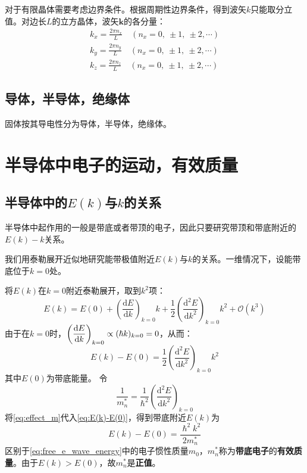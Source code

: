 对于有限晶体需要考虑边界条件。根据周期性边界条件，得到波矢$k$只能取分立值。对边长$L$的立方晶体，波矢$\bm k$的各分量：
\begin{equation}
\begin{split}
    k_x=\frac{2\pi n_x}{L}\quad (n_x=0,\ \pm 1,\ \pm 2,\cdots)\\
    k_y=\frac{2\pi n_y}{L}\quad (n_x=0,\ \pm 1,\ \pm 2,\cdots)\\
    k_z=\frac{2\pi n_z}{L}\quad (n_x=0,\ \pm 1,\ \pm 2,\cdots)
\end{split}
\end{equation}

\subsection{导体，半导体，绝缘体}

固体按其导电性分为导体，半导体，绝缘体。

\section{半导体中电子的运动，有效质量}

\subsection{半导体中的\texorpdfstring{$E(k)$}{E(k)}与\texorpdfstring{$k$}{k}的关系}

半导体中起作用的一般是带底或者带顶的电子，因此只要研究带顶和带底附近的$E(k)-k$关系。

我们用泰勒展开近似地研究能带极值附近$E(k)$与$k$的关系。一维情况下，设能带底位于$k=0$处。

将$E(k)$在$k=0$附近泰勒展开，取到$k^2$项：
\begin{equation}
    E(k)=E(0)+\left(\frac{\mathrm{d}E}{\mathrm{d}k}\right)_{k=0}k+\frac{1}{2}\left(\frac{\mathrm{d^2}E}{\mathrm{d}k^2}\right)_{k=0}k^2+\mathcal{O}(k^3)
\end{equation}
\vspace{1ex}由于在$k=0$时，$\displaystyle\left(\frac{\mathrm{d}E}{\mathrm{d}k}\right)_{k=0}\propto (\hslash k)_{k=0}=0$，从而：
\begin{equation}
    E(k)-E(0)=\frac{1}{2}\left(\frac{\mathrm{d}^2E}{\mathrm{d}k^2}\right)_{k=0}k^2\label{eq:E(k)-E(0)}
\end{equation}
其中$E(0)$为带底能量。
令
\begin{equation}
    \frac{1}{m_n^*}=\frac{1}{\hslash^2}\left(\frac{\mathrm{d}^2E}{\mathrm{d}k^2}\right)_{k=0}\label{eq:effect_m}
\end{equation}
将\autoref{eq:effect_m}代入\autoref{eq:E(k)-E(0)}，得到带底附近$E(k)$为
\begin{equation}
    E(k)-E(0)=\frac{\hslash^2k^2}{2m_n^*}\label{eq:electron_effect_mass_energy_bottom}
\end{equation}
区别于\autoref{eq:free_e_wave_energy}中的电子惯性质量$m_0$，$m_n^*$称为\textbf{带底电子}的\textbf{有效质量}。由于$E(k)>E(0)$，故$m_n^*$是\textbf{正值}。

